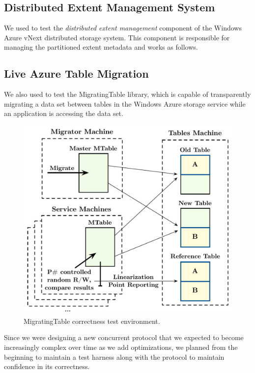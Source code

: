 \subsection{Distributed Extent Management System}
\label{sec:cases:azurestore}

We used \psharp to test the \emph{distributed extent management} component of the Windows Azure vNext distributed storage system. This component is responsible for managing the partitioned extent metadata and works as follows.

\subsection{Live Azure Table Migration}

\def\term#1{\emph{#1}}
We also used \psharp to test the MigratingTable library, which is capable of transparently migrating a data set between tables in the Windows Azure storage service while an application is accessing the data set.

\begin{figure}[t]
\centering
\includegraphics[width=\linewidth]{img/mocked_migration}
\caption{MigratingTable \psharp correctness test environment.}
\label{fig:mockedmigration}
\end{figure}

Since we were designing a new concurrent protocol that we expected to become increasingly complex over time as we add optimizations, we planned from the beginning to maintain a \psharp test harness along with the protocol to maintain confidence in its correctness.

